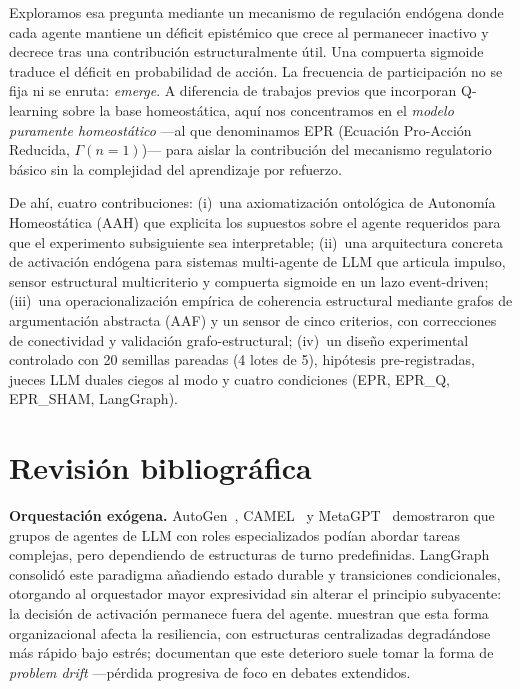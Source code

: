 \documentclass{llncs}
\begin{document}
Exploramos esa pregunta mediante un mecanismo de regulaci\'on
end\'ogena donde cada agente mantiene un d\'eficit epist\'emico
que crece al permanecer inactivo y decrece tras una contribuci\'on
estructuralmente \'util. Una compuerta sigmoide traduce el d\'eficit en
probabilidad de acci\'on. La frecuencia de participaci\'on no se fija
ni se enruta: \emph{emerge}. A diferencia de trabajos previos que
incorporan Q-learning sobre la base homeost\'atica, aqu\'i nos
concentramos en el \emph{modelo puramente homeost\'atico} ---al que
denominamos EPR (Ecuaci\'on Pro-Acci\'on Reducida, $\Gamma(n{=}1)$)--- 
para aislar la contribuci\'on del mecanismo regulatorio b\'asico sin la
complejidad del aprendizaje por refuerzo.

De ah\'i, cuatro contribuciones: (i)~una axiomatizaci\'on
ontol\'ogica de Autonom\'ia Homeost\'atica (AAH) que explicita los
supuestos sobre el agente requeridos para que el experimento
subsiguiente sea interpretable; (ii)~una arquitectura concreta de
activaci\'on end\'ogena para sistemas multi-agente de LLM que articula
impulso, sensor estructural multicriterio y compuerta sigmoide en un
lazo event-driven; (iii)~una operacionalizaci\'on emp\'irica de
coherencia estructural mediante grafos de argumentaci\'on abstracta
(AAF) y un sensor de cinco criterios, con correcciones de
conectividad y validaci\'on grafo-estructural; (iv)~un dise\~no
experimental controlado con 20 semillas pareadas (4 lotes de 5), hip\'otesis
pre-registradas, jueces LLM duales ciegos al modo y cuatro condiciones
(EPR, EPR\_Q, EPR\_SHAM, LangGraph).

\section{Revisi\'on bibliogr\'afica}
\label{sec:related}

\textbf{Orquestaci\'on ex\'ogena.}
AutoGen~\parencite{wu2023autogen}, CAMEL~\parencite{li2023camel} y
MetaGPT~\parencite{hong2023metagpt} demostraron que grupos de agentes
de LLM con roles especializados pod\'ian abordar tareas complejas, pero
dependiendo de estructuras de turno predefinidas. LangGraph consolid\'o
este paradigma a\~nadiendo estado durable y transiciones condicionales,
otorgando al orquestador mayor expresividad sin alterar el principio
subyacente: la decisi\'on de activaci\'on permanece fuera del agente.
\textcite{huang2025resilience} muestran que esta forma organizacional
afecta la resiliencia, con estructuras centralizadas degrad\'andose m\'as
r\'apido bajo estr\'es; \textcite{becker2026problemdrift} documentan
que este deterioro suele tomar la forma de \emph{problem drift}
---p\'erdida progresiva de foco en debates extendidos.
\end{document}
